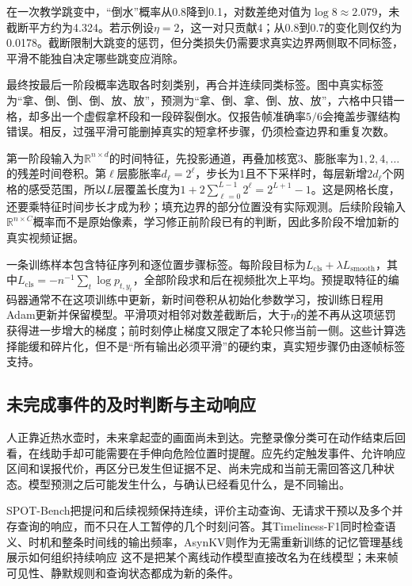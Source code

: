 在一次教学跳变中，“倒水”概率从0.8降到0.1，对数差绝对值为$\log 8\approx2.079$，未截断平方约为4.324。若示例设$\eta=2$，这一对只贡献4；从0.8到0.7的变化则仅约为0.0178。截断限制大跳变的惩罚，但分类损失仍需要求真实边界两侧取不同标签，平滑不能独自决定哪些跳变应消除。

最终按最后一阶段概率选取各时刻类别，再合并连续同类标签。图中真实标签为“拿、倒、倒、倒、放、放”，预测为“拿、倒、拿、倒、放、放”，六格中只错一格，却多出一个虚假拿杯段和一段碎裂倒水。仅报告帧准确率$5/6$会掩盖步骤结构错误。相反，过强平滑可能删掉真实的短拿杯步骤，仍须检查边界和重复次数。

第一阶段输入为$\mathbb{R}^{n\times d}$的时间特征，先投影通道，再叠加核宽3、膨胀率为$1,2,4,\ldots$的残差时间卷积。第$\ell$层膨胀率$d_\ell=2^\ell$，步长为1且不下采样时，每层新增$2d_\ell$个网格的感受范围，所以$L$层覆盖长度为$1+2\sum_{\ell=0}^{L-1}2^\ell=2^{L+1}-1$。这是网格长度，还要乘特征时间步长才成为秒；填充边界的部分位置没有实际观测。后续阶段输入$\mathbb{R}^{n\times C}$概率而不是原始像素，学习修正前阶段已有的判断，因此多阶段不增加新的真实视频证据。

一条训练样本包含特征序列和逐位置步骤标签。每阶段目标为$L_{\mathrm{cls}}+\lambda L_{\mathrm{smooth}}$，其中$L_{\mathrm{cls}}=-n^{-1}\sum_t\log p_{t,y_t}$，全部阶段求和后在视频批次上平均。预提取特征的编码器通常不在这项训练中更新，新时间卷积从初始化参数学习，按训练日程用Adam更新并保留模型。平滑项对相邻对数差截断后，大于$\eta$的差不再从这项惩罚获得进一步增大的梯度；前时刻停止梯度又限定了本轮只修当前一侧。这些计算选择能缓和碎片化，但不是“所有输出必须平滑”的硬约束，真实短步骤仍由逐帧标签支持。

\subsection{未完成事件的及时判断与主动响应}
\label{sec:vision-video-proactive-response}

人正靠近热水壶时，未来拿起壶的画面尚未到达。完整录像分类可在动作结束后回看，在线助手却可能需要在手伸向危险位置时提醒。应先约定触发事件、允许响应区间和误报代价，再区分已发生但证据不足、尚未完成和当前无需回答这几种状态。模型预测之后可能发生什么，与确认已经看见什么，是不同输出。

SPOT-Bench把提问和后续视频保持连续，评价主动查询、无请求干预以及多个并存查询的响应，而不只在人工暂停的几个时刻问答。其Timeliness-F1同时检查语义、时机和整条时间线的输出频率，AsynKV则作为无需重新训练的记忆管理基线展示如何组织持续响应 这不是把某个离线动作模型直接改名为在线模型；未来帧可见性、静默规则和查询状态都成为新的条件。

